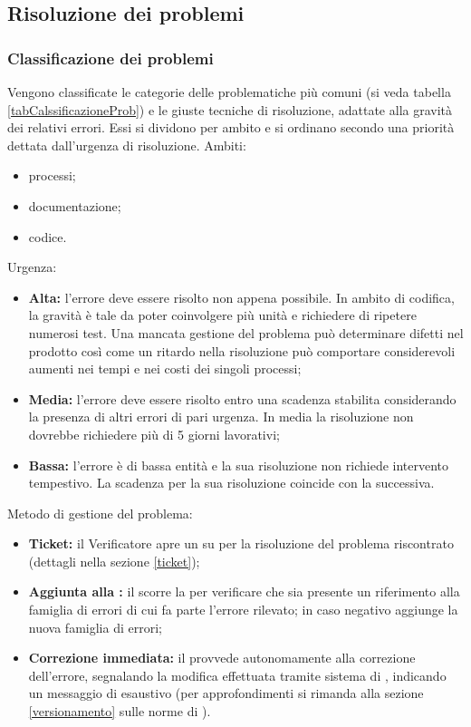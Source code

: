 \documentclass[12pt,a4paper]{article}
\begin{document}
\subsection{Risoluzione dei problemi}

\subsubsection{Classificazione dei problemi}
Vengono classificate le categorie delle problematiche più comuni (si veda tabella \ref{tabCalssificazioneProb}) e le giuste tecniche di risoluzione, adattate alla gravità dei relativi errori. Essi si dividono per ambito e si ordinano secondo una priorità dettata dall'urgenza di risoluzione. Ambiti:
\begin{itemize}
	\item processi;
	\item documentazione;
	\item codice.
\end{itemize}
Urgenza:
\begin{itemize}
	\item \textbf{Alta:} l'errore deve essere risolto non appena possibile. In ambito di codifica, la gravità è tale da poter coinvolgere più unità e richiedere di ripetere numerosi test. Una mancata gestione del problema può determinare difetti nel prodotto così come un ritardo nella risoluzione può comportare considerevoli aumenti nei tempi e nei costi dei singoli processi;
	\item \textbf{Media:} l'errore deve essere risolto entro una scadenza stabilita considerando la presenza di altri errori di pari urgenza. In media la risoluzione non dovrebbe richiedere più di 5 giorni lavorativi;
	\item \textbf{Bassa:} l'errore è di bassa entità e la sua risoluzione non richiede intervento tempestivo. La scadenza per la sua risoluzione coincide con la  successiva.
\end{itemize}
Metodo di gestione del problema:
\begin{itemize}
	\item \textbf{Ticket:} il Verificatore apre un  su  per la risoluzione del problema riscontrato (dettagli nella sezione \ref{ticket});
	\item \textbf{Aggiunta alla :} il \VR{} scorre la  per verificare che sia presente un riferimento alla famiglia di errori di cui fa parte l'errore rilevato; in caso negativo aggiunge la nuova famiglia di errori;
	\item \textbf{Correzione immediata:} il \VR{} provvede autonomamente alla correzione dell'errore, segnalando la modifica effettuata tramite sistema di , indicando un messaggio di  esaustivo (per approfondimenti si rimanda alla sezione \ref{versionamento} sulle norme di ).
\end{itemize}
\end{document}
